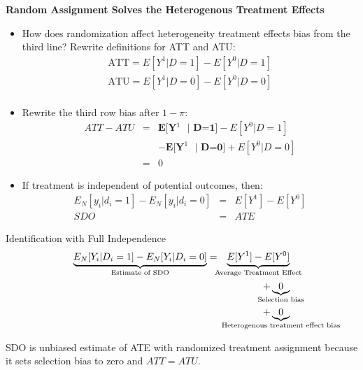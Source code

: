 \documentclass{beamer}
\begin{document}
\begin{frame}[shrink=20,plain]
  \begin{center}
    \textbf{Random Assignment Solves the Heterogenous Treatment Effects}
  \end{center}

  \begin{itemize}
    \item How does randomization affect heterogeneity treatment effects bias from the third line?  Rewrite definitions for ATT and ATU:\begin{eqnarray*}
            \text{ATT} = E[Y^1 | D=1] - E[Y^0 | D=1] \\
            \text{ATU} = E[Y^1 | D=0] - E[Y^0 | D=0] \\
          \end{eqnarray*}
    \item Rewrite the third row bias after $1-\pi$:\begin{eqnarray*}
            ATT - ATU &=& \textbf{E[Y$^1$ $|$ D=1]} - E[Y^0 | D=1] \\
            && - \textbf{E[Y$^1$ $|$ D=0]} + E[Y^0 | D=0] \\
            &=& 0
          \end{eqnarray*}
    \item If treatment is independent of potential outcomes, then:\begin{eqnarray*}
            E_N[y_i | d_i=1] - E_N[y_i | d_i=0]  &=& E[Y^1] - E[Y^0] \\
            SDO &=& ATE
          \end{eqnarray*}
  \end{itemize}
\end{frame}






\begin{frame}[plain]

  \begin{block}{Identification with Full Independence}
    \begin{eqnarray*}
      \underbrace{E_N[Y_i | D_i=1] - E_N[Y_i | D_i=0]}_{ \mathclap{\text{Estimate of SDO}}}&=& \underbrace{E[Y^1] - E[Y^0]}_{ \mathclap{\text{Average Treatment Effect}}} \\
    &&+ \underbrace{0}_{ \mathclap{\text{Selection bias}}}  \\
    && + \underbrace{0}_{ \mathclap{\text{Heterogenous treatment effect bias}}}
    \end{eqnarray*}
  \end{block}
  
  SDO is unbiased estimate of ATE with randomized treatment assignment because it sets selection bias to zero and $ATT=ATU$.



\end{frame}
\end{document}
